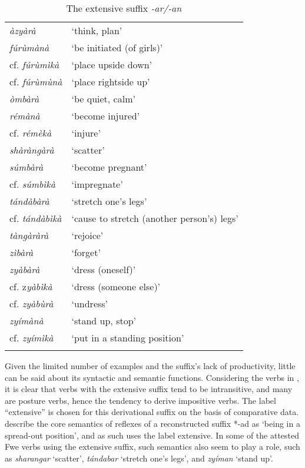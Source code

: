 \begin{table}[b]
\label{bkm:Ref486254096}\caption{\label{tab:6:12}The extensive suffix \textit{-ar/-an}}
\begin{tabular}{ll}
\lsptoprule
{\itshape àzyàrà} & ‘think, plan’\\
{\itshape fúrùmànà} & ‘be initiated (of girls)’\\
cf. \textit{fúrùmìkà} & ‘place upside down’\\
cf. \textit{fúrùmùnà} & ‘place rightside up’\\
{\itshape òmbàrà} & ‘be quiet, calm’\\
{\itshape rémànà} & ‘become injured’\\
cf. \textit{rémèkà} &  ‘injure’\\
{\itshape shàràngàrà} & ‘scatter’\\
{\itshape súmbàrà} & ‘become pregnant’\\
cf. \textit{súmbìkà} &  ‘impregnate’ \\
{\itshape tándàbàrà} & ‘stretch one’s legs’\\
cf. \textit{tándàbìkà}  &  ‘cause to stretch (another person’s) legs’\\
{\itshape tàngàràrà} & ‘rejoice’\\
{\itshape zìbàrà} & ‘forget’\\
{\itshape zyàbàrà} &  ‘dress (oneself)’\\
cf. z\textit{yàbìkà} & ‘dress (someone else)’\\
cf. \textit{zyàbùrà} &  ‘undress’\\
{\itshape zyímànà} & ‘stand up, stop’\\
cf. \textit{zyímìkà} & ‘put in a standing position’\\
\lspbottomrule
\end{tabular}
\end{table}

Given the limited number of examples and the suffix’s lack of productivity, little can be said about its syntactic and semantic functions. Considering the verbs in , it is clear that verbs with the extensive suffix tend to be intransitive, and many are posture verbs, hence the tendency to derive impositive verbs. The label “extensive” is chosen for this derivational suffix on the basis of comparative data.  {\citet[184]{SchadebergBostoen2019}} describe the core semantics of reflexes of a reconstructed suffix *\nobreakdash-ad as ‘being in a spread-out position’, and as such uses the label extensive. In some of the attested Fwe verbs using the extensive suffix, such semantics also seem to play a role, such as \textit{sharangar} ‘scatter’, \textit{tándabar} ‘stretch one’s legs’, and \textit{zyíman} ‘stand up’.

